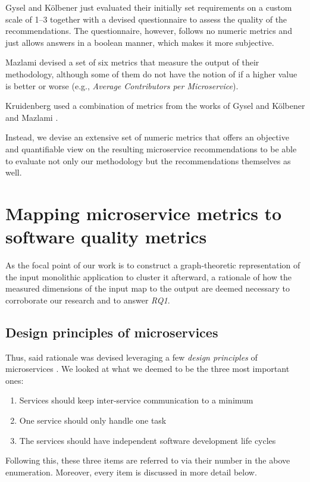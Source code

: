 \documentclass[12pt,a4paper]{report}
\begin{document}
Gysel and K{\"o}lbener \cite{gysel2016service} just evaluated their initially
set requirements on a custom scale of 1--3 together with a devised
questionnaire to assess the quality of the recommendations. The questionnaire,
however, follows no numeric metrics and just allows answers in a boolean
manner, which makes it more subjective.

Mazlami \cite{mazlami2017extraction} devised a set of six metrics that measure
the output of their methodology, although some of them do not have the notion
of if a higher value is better or worse (e.g., \textit{Average Contributors per
Microservice}).

Kruidenberg \cite{kruidenberg2018monoliths} used a combination of metrics from
the works of Gysel and K{\"o}lbener \cite{gysel2016service} and Mazlami
\cite{mazlami2017extraction}.

Instead, we devise an extensive set of numeric metrics that offers an objective
and quantifiable view on the resulting microservice recommendations to be able
to evaluate not only our methodology but the recommendations themselves as
well.




\chapter{Mapping microservice metrics to software quality metrics} \label{chap:rationale}

As the focal point of our work is to construct a graph-theoretic representation
of the input monolithic application to cluster it afterward, a rationale of how
the measured dimensions of the input map to the output are deemed necessary to
corroborate our research and to answer \textit{RQ1}.



\section{Design principles of microservices}

Thus, said rationale was devised leveraging a few \textit{design principles} of
microservices \cite{ms-design-principles, ms-fowler, newman2015building}.
We looked at what we deemed to be the three most important ones:
\begin{enumerate}
  \item Services should keep inter-service communication to a minimum
  \item One service should only handle one task
  \item The services should have independent software development life cycles
\end{enumerate}
Following this, these three items are referred to via their number
in the above enumeration. Moreover, every item is discussed in more detail below.
\end{document}
